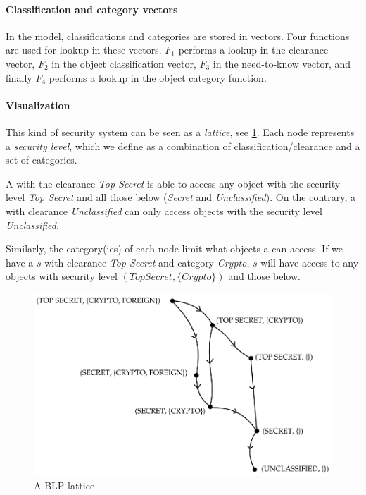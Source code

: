 \paragraph{Classification and category vectors}
 In the model, classifications and categories are stored in vectors.
 Four functions are used for lookup in these vectors.
 $F_1$ performs a lookup in the \ssubject{} clearance vector, $F_2$ in the object classification vector, $F_3$ in the \ssubject{} need-to-know vector, and finally $F_4$ performs a lookup in the object category function.

\paragraph{Visualization}
This kind of security system can be seen as a \textit{lattice}, see \cref{blp:lattice}.
Each node represents a \emph{security level}, which we define as a combination of classification/clearance and a set of categories.

A \ssubject{} with the clearance \emph{Top Secret} is able to access any object with the security level \emph{Top Secret} and all those below (\emph{Secret} and \emph{Unclassified}).
On the contrary, a \ssubject{} with clearance \emph{Unclassified} can only access objects with the security level \emph{Unclassified}.

Similarly, the category(ies) of each node limit what objects a \ssubject{} can access.
If we have a \ssubject{} $s$ with clearance \emph{Top Secret} and category \emph{Crypto}, $s$ will have access to any objects with security level $(Top Secret, \{Crypto\})$ and those below.

\begin{figure}
\centering
\includegraphics[width=\textwidth]{figures/blp_lattice}
\caption{A BLP lattice \cite{security_engineering_ross_anderson}}
\label{blp:lattice}
\end{figure}

